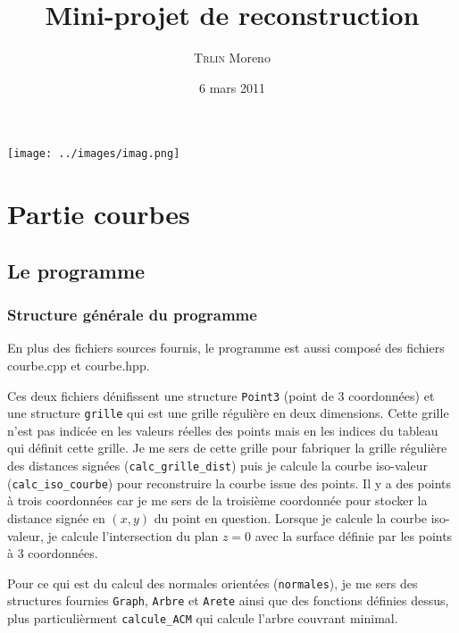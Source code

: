 \documentclass[11pt,a4paper]{article}
\title{
  \huge{\bf Mini-projet de reconstruction}
}
\author{
    \textsc{Trlin} Moreno \\
}
\date{6 mars 2011}
\begin{document}
 \maketitle
  \begin{center}
   \texttt{[image: ../images/imag.png]}

  \end{center}
 \tableofcontents

\pagebreak

\section{Partie courbes}
\subsection{Le programme}
\subsubsection{Structure générale du programme}
En plus des fichiers sources fournis, le programme est aussi composé des fichiers courbe.cpp et courbe.hpp.

Ces deux fichiers dénifissent une structure {\tt Point3} (point de 3 coordonnées) et une structure {\tt grille} qui est une grille régulière en deux dimensions.
Cette grille n'est pas indicée en les valeurs réelles des points mais en les indices du tableau qui définit cette grille.
Je me sers de cette grille pour fabriquer la grille régulière des distances signées ({\tt calc\_grille\_dist}) puis je calcule la courbe
iso-valeur ({\tt calc\_iso\_courbe}) pour reconstruire la courbe issue des points. Il y a des points à trois coordonnées car je me sers
de la troisième coordonnée pour stocker la distance signée en $(x,y)$ du point en question. Lorsque je calcule la courbe iso-valeur, je calcule l'intersection
du plan $z=0$ avec la surface définie par les points à 3 coordonnées.

Pour ce qui est du calcul des normales orientées ({\tt normales}), je me sers des structures fournies {\tt Graph}, {\tt Arbre} et {\tt Arete} ainsi que
des fonctions définies dessus, plus particulièrment {\tt calcule\_ACM} qui calcule l'arbre couvrant minimal.
\end{document}
